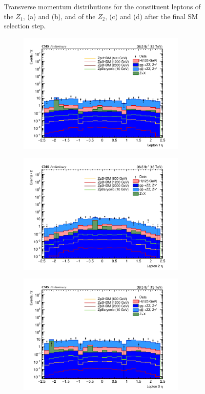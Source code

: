 \begin{figure}[tbh]
\begin{subfigure}{0.50\textwidth}
\caption{}
\end{subfigure}
\caption{Transverse momentum distributions for the constituent leptons of the $Z_1$, (a) and (b), and of the $Z_2$, (c) and (d) after the final SM selection step.}
\label{fig:leptkinsm1}
\end{figure}

\begin{figure}[tbh]
\begin{subfigure}{0.50\textwidth}
\centering
\includegraphics[width=3.3in]{figures/hist_hlept1_eta_CR.png}
\caption{}
\end{subfigure}
\begin{subfigure}{0.50\textwidth}
\centering
\includegraphics[width=3.3in]{figures/hist_hlept2_eta_CR.png}
\caption{}
\end{subfigure}
\begin{subfigure}{0.50\textwidth}
\centering
\includegraphics[width=3.3in]{figures/hist_hlept3_eta_CR.png}

\end{subfigure}
\end{figure}
